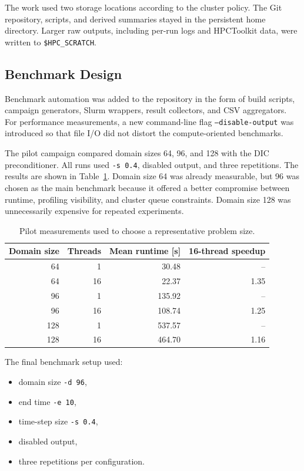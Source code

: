 \documentclass[10pt,firstlineindent,nopartpage,article,accentcolor=tud1b]{tudreport}
\begin{document}
The work used two storage locations according to the cluster policy. The Git
repository, scripts, and derived summaries stayed in the persistent home
directory. Larger raw outputs, including per-run logs and HPCToolkit data, were
written to \texttt{\$HPC\_SCRATCH}.

\subsection{Benchmark Design}
Benchmark automation was added to the repository in the form of build scripts,
campaign generators, Slurm wrappers, result collectors, and CSV aggregators.
For performance measurements, a new command-line flag
\texttt{--disable-output} was introduced so that file I/O did not distort the
compute-oriented benchmarks.

The pilot campaign compared domain sizes 64, 96, and 128 with the DIC
preconditioner. All runs used \texttt{-s 0.4}, disabled output, and three
repetitions. The results are shown in Table~\ref{tab:pilot}. Domain size 64 was
already measurable, but 96 was chosen as the main benchmark because it offered
a better compromise between runtime, profiling visibility, and cluster queue
constraints. Domain size 128 was unnecessarily expensive for repeated
experiments.

\begin{table}[H]
\centering
\caption{Pilot measurements used to choose a representative problem size.}
\label{tab:pilot}
\begin{tabular}{rrrr}
\toprule
Domain size & Threads & Mean runtime [s] & 16-thread speedup \\
\midrule
64  & 1  & 30.48  & -- \\
64  & 16 & 22.37  & 1.35 \\
96  & 1  & 135.92 & -- \\
96  & 16 & 108.74 & 1.25 \\
128 & 1  & 537.57 & -- \\
128 & 16 & 464.70 & 1.16 \\
\bottomrule
\end{tabular}
\end{table}

The final benchmark setup used:
\begin{itemize}[leftmargin=*]
\item domain size \texttt{-d 96},
\item end time \texttt{-e 10},
\item time-step size \texttt{-s 0.4},
\item disabled output,
\item three repetitions per configuration.
\end{itemize}
\end{document}
